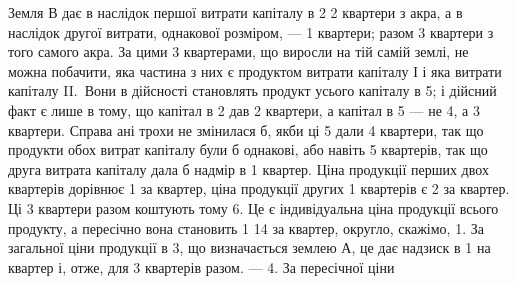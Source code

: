 
Земля $В$ дає в наслідок першої витрати капіталу в 2 2 квартери
з акра, а в наслідок другої витрати, однакової розміром, — 1 квартери; разом
3 квартери з того самого акра. За цими 3 квартерами, що виросли
на тій самій землі, не можна побачити, яка частина з них є продуктом витрати
капіталу І і яка витрати капіталу II.~Вони в дійсності становлять продукт
усього капіталу в 5; і дійсний факт є лише в тому, що капітал
в 2 дав 2 квартери, а капітал в 5 — не 4, а 3 квартери.
Справа ані трохи не змінилася б, якби ці 5 дали 4 квартери, так що
продукти обох витрат капіталу були б однакові, або навіть 5 квартерів, так
що друга витрата капіталу дала б надмір в 1 квартер. Ціна продукції перших
двох квартерів дорівнює 1 за квартер, ціна продукції других 1 квартерів є 2 за квартер. Ці 3 квартери разом коштують тому 6.
Це є індивідуальна ціна продукції всього продукту, а пересічно вона становить
1 14 за квартер, округло, скажімо, 1. За загальної ціни
продукції в 3, що визначається землею $А$, це дає надзиск в 1
на квартер і, отже, для 3 квартерів разом. — 4. За пересічної ціни
\parbreak{}  %
